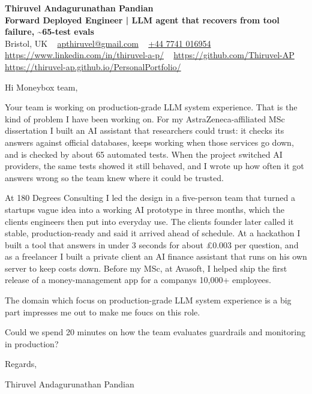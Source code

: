 \documentclass[11pt,a4paper]{article}
\begin{document}
\raggedright
\pagestyle{empty}

\begin{center}
    {\LARGE \color{linkblue} \textbf{Thiruvel Andagurunathan Pandian}}\\[0.2cm]
    {\color{headernavy}\small\textbf{Forward Deployed Engineer | LLM agent that recovers from tool failure, \textasciitilde{}65-test evals}}\\[0.2cm]
    {\small Bristol, UK\nobreak\ \,\textbar\, \href{mailto:apthiruvel@gmail.com}{apthiruvel@gmail.com}\nobreak\ \,\textbar\, \href{tel:+447741016954}{+44 7741 016954}\nobreak\ \,\textbar\, \href{https://www.linkedin.com/in/thiruvel-a-p/}{https://www.linkedin.com/in/thiruvel-a-p/}\nobreak\ \,\textbar\, \href{https://github.com/Thiruvel-AP}{https://github.com/Thiruvel-AP}\nobreak\ \,\textbar\, \href{https://thiruvel-ap.github.io/PersonalPortfolio/}{https://thiruvel-ap.github.io/PersonalPortfolio/}}

\end{center}

\vspace{0.4cm}

\noindent
Hi Moneybox team,

Your team is working on production-grade LLM system experience. That is the kind of problem I have been working on. For my AstraZeneca-affiliated MSc dissertation I built an AI assistant that researchers could trust: it checks its answers against official databases, keeps working when those services go down, and is checked by about 65 automated tests. When the project switched AI providers, the same tests showed it still behaved, and I wrote up how often it got answers wrong so the team knew where it could be trusted.

At 180 Degrees Consulting I led the design in a five-person team that turned a startup\textquotesingle{}s vague idea into a working AI prototype in three months, which the client\textquotesingle{}s engineers then put into everyday use. The client\textquotesingle{}s founder later called it \textquotedbl{}stable, production-ready\textquotedbl{} and said it arrived \textquotedbl{}ahead of schedule\textquotedbl{}. At a hackathon I built a tool that answers in under 3 seconds for about £0.003 per question, and as a freelancer I built a private client an AI finance assistant that runs on his own server to keep costs down. Before my MSc, at Avasoft, I helped ship the first release of a money-management app for a company\textquotesingle{}s 10,000+ employees.

The domain which focus on production-grade LLM system experience is a big part impresses me out to make me foucs on this role.

Could we spend 20 minutes on how the team evaluates guardrails and monitoring in production?

\vspace{0.5cm}

Regards,

Thiruvel Andagurunathan Pandian
\end{document}
